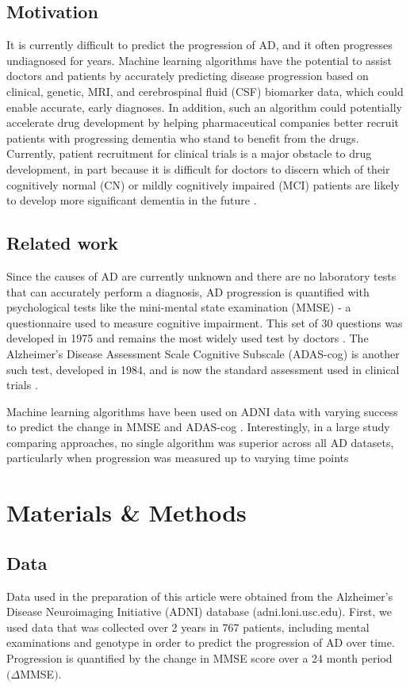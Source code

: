 \documentclass{article}
\begin{document}
\subsection{Motivation}
It is currently difficult to predict the progression of AD, and it often progresses undiagnosed for years. Machine learning algorithms have the potential to assist doctors and patients by accurately predicting disease progression based on clinical,  genetic, MRI, and cerebrospinal fluid (CSF) biomarker data, which could enable accurate, early diagnoses. In addition, such an algorithm could potentially accelerate drug development by helping pharmaceutical companies better recruit patients with progressing dementia who stand to benefit from the drugs. Currently, patient recruitment for clinical trials is a major obstacle to drug development, in part because it is difficult for doctors to discern which of their cognitively normal (CN) or mildly cognitively impaired (MCI) patients are likely to develop more significant dementia in the future \cite{watson14}.

\subsection{Related work} Since the causes of AD are currently unknown and there are no laboratory tests that can accurately perform a diagnosis, AD progression is quantified with psychological tests like the mini-mental state examination (MMSE) - a questionnaire used to measure cognitive impairment. This set of 30 questions was developed in 1975 and remains the most widely used test by doctors \cite{carolan07}. The Alzheimer's Disease Assessment Scale Cognitive Subscale (ADAS-cog) is another such test, developed in 1984, and is now the standard assessment used in clinical trials \cite{meade05}.

Machine learning algorithms have been used on ADNI data with varying success to predict the change in MMSE and ADAS-cog \cite{stonnington10}.
Interestingly, in a large study comparing approaches, no single algorithm was superior across all AD datasets, particularly when progression was measured up to varying time points \cite{umer11}


\section{Materials \& Methods}
\subsection{Data} Data used in the preparation of this article were obtained from the Alzheimer's Disease Neuroimaging Initiative (ADNI) database (adni.loni.usc.edu). First, we used data that was collected over 2 years in 767 patients, including mental examinations and genotype in order to predict the progression of AD over time. Progression is quantified by the change in MMSE score over a 24 month period $(\Delta$MMSE$)$.\\
\end{document}
